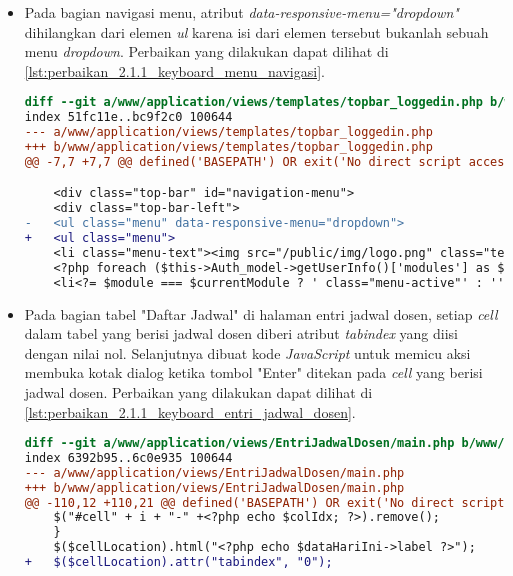 \begin{itemize}
\item Pada bagian navigasi menu, atribut \textit{data-responsive-menu="dropdown"} dihilangkan dari elemen \textit{ul} karena isi dari elemen tersebut bukanlah sebuah menu \textit{dropdown}. Perbaikan yang dilakukan dapat dilihat di \ref{lst:perbaikan_2.1.1_keyboard_menu_navigasi}.
\begin{lstlisting}[frame=single, label={lst:perbaikan_2.1.1_keyboard_menu_navigasi}, language=diff, caption=Perbaikan Kriteria Sukses 2.1.1 - Penggunaan \textit{Keyboard} pada Menu Navigasi]
diff --git a/www/application/views/templates/topbar_loggedin.php b/www/application/views/templates/topbar_loggedin.php
index 51fc11e..bc9f2c0 100644
--- a/www/application/views/templates/topbar_loggedin.php
+++ b/www/application/views/templates/topbar_loggedin.php
@@ -7,7 +7,7 @@ defined('BASEPATH') OR exit('No direct script access allowed');

    <div class="top-bar" id="navigation-menu">
    <div class="top-bar-left">
-   <ul class="menu" data-responsive-menu="dropdown">
+   <ul class="menu">
    <li class="menu-text"><img src="/public/img/logo.png" class="textsized" alt="B"/></li>
    <?php foreach ($this->Auth_model->getUserInfo()['modules'] as $module): ?>
    <li<?= $module === $currentModule ? ' class="menu-active"' : '' ?>><a href="/<?= $module ?>"><?= $this->config->item('module-names')[$module] ?></a></li>
\end{lstlisting}

\item Pada bagian tabel "Daftar Jadwal" di halaman entri jadwal dosen, setiap \textit{cell} dalam tabel yang berisi jadwal dosen diberi atribut \textit{tabindex} yang diisi dengan nilai nol. Selanjutnya dibuat kode \textit{JavaScript} untuk memicu aksi membuka kotak dialog ketika tombol "Enter" ditekan pada \textit{cell} yang berisi jadwal dosen. Perbaikan yang dilakukan dapat dilihat di \ref{lst:perbaikan_2.1.1_keyboard_entri_jadwal_dosen}.
\begin{lstlisting}[frame=single, label={lst:perbaikan_2.1.1_keyboard_entri_jadwal_dosen}, language=diff, caption=Perbaikan Kriteria Sukses 2.1.1 - Penggunaan \textit{Keyboard} pada Halaman Entri Jadwal Dosen]
diff --git a/www/application/views/EntriJadwalDosen/main.php b/www/application/views/EntriJadwalDosen/main.php
index 6392b95..6c0e935 100644
--- a/www/application/views/EntriJadwalDosen/main.php
+++ b/www/application/views/EntriJadwalDosen/main.php
@@ -110,12 +110,21 @@ defined('BASEPATH') OR exit('No direct script access allowed');
    $("#cell" + i + "-" +<?php echo $colIdx; ?>).remove();
    }
    $($cellLocation).html("<?php echo $dataHariIni->label ?>");
+   $($cellLocation).attr("tabindex", "0");


\end{lstlisting}
\end{itemize}
